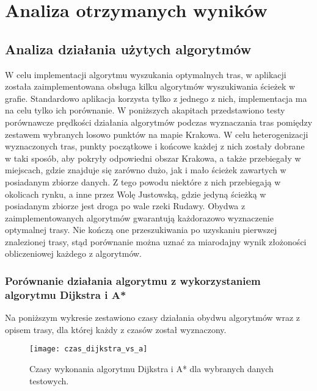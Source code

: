 \chapter{Analiza otrzymanych wyników}
\label{cha:analiza_otrzymanych_wynikow}


\section{Analiza działania użytych algorytmów}

W celu implementacji algorytmu wyszukania optymalnych tras, w aplikacji została zaimplementowana obsługa kilku algorytmów wyszukiwania ścieżek w grafie. Standardowo aplikacja korzysta tylko z jednego z nich, implementacja ma na celu tylko ich porównanie. W poniższych akapitach przedstawiono testy porównawcze prędkości działania algorytmów podczas wyznaczania tras pomiędzy zestawem wybranych losowo punktów na mapie Krakowa. 
W celu heterogenizacji wyznaczonych tras, punkty początkowe i końcowe każdej z nich zostały dobrane w taki sposób, aby pokryły odpowiedni obszar Krakowa, a także przebiegały w miejscach, gdzie znajduje się zarówno dużo, jak i mało ścieżek zawartych w posiadanym zbiorze danych. Z tego powodu niektóre z nich przebiegają w okolicach rynku, a inne przez Wolę Justowską, gdzie jedyną ścieżką w posiadanym zbiorze jest droga po wale rzeki Rudawy.
Obydwa z zaimplementowanych algorytmów gwarantują każdorazowo wyznaczenie optymalnej trasy. Nie kończą one przeszukiwania po uzyskaniu pierwszej znalezionej trasy, stąd porównanie można uznać za miarodajny wynik złożoności obliczeniowej każdego z algorytmów.

\subsection{Porównanie działania algorytmu z wykorzystaniem algorytmu Dijkstra i A*}

Na poniższym wykresie zestawiono czasy działania obydwu algorytmów wraz z opisem trasy, dla której każdy z czasów został wyznaczony.

\begin{figure}[H]
\centering
\texttt{[image: czas\_dijkstra\_vs\_a]}
\caption{Czasy wykonania algorytmu Dijkstra i A* dla wybranych danych testowych.}
\end{figure}

